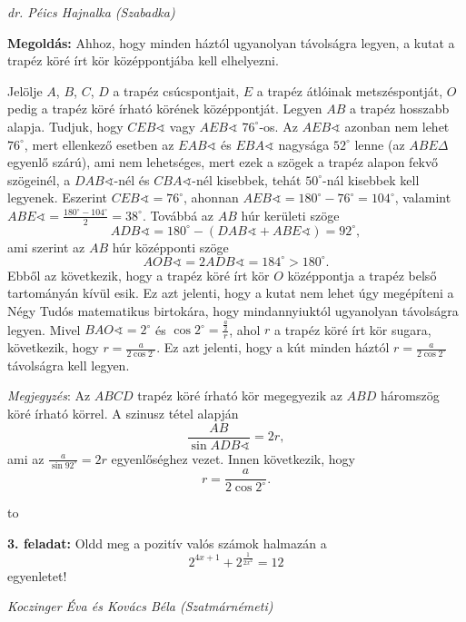 \documentclass[a4paper,10pt]{article}
\newcommand{\ki}[2]{\hfill {\it #1 (#2)}\medskip}
\newcommand{\vonal}{\hbox to \hsize{\hskip2truecm\hrulefill\hskip2truecm}}
\begin{document}
\ki{dr. Péics Hajnalka}{Szabadka}\medskip

{\bf Megoldás: }   Ahhoz, hogy minden háztól ugyanolyan távolságra le\-gyen,
a kutat a trapéz köré írt kör középpontjába kell elhelyezni.

Jelölje $A$, $B$, $C$, $D$ a trapéz csúcspontjait, $E$ a trapéz
átlóinak metszéspontját, $O$ pedig a trapéz köré írható körének
kö\-zép\-pont\-ját. Legyen $AB$ a trapéz hosszabb alapja. Tudjuk,
hogy ${CEB}\sphericalangle$ vagy ${AEB}\sphericalangle$ $76^\circ$-os. Az
${AEB}\sphericalangle$ azonban nem lehet $76^\circ $, mert ellenkező
esetben az ${EAB}\sphericalangle$ és ${EBA}\sphericalangle$ nagysága $52^\circ $
lenne (az $ABE\Delta $ egyenlő szárú), ami nem lehetséges, mert
ezek a szögek a trapéz alapon fekvő szögeinél, a
${DAB}\sphericalangle$-nél és ${CBA}\sphericalangle$-nél kisebbek, tehát $50^\circ
$-nál kisebbek kell legyenek. Eszerint ${CEB}\sphericalangle = 76^\circ $,
ahonnan ${AEB}\sphericalangle= 180^\circ - 76^\circ  = 104^\circ $,
valamint ${ABE}\sphericalangle = \frac{{180^\circ - 104^\circ }}{2} =
38^\circ $. Továbbá az $AB$ húr kerületi szöge $${ADB}\sphericalangle =
180^\circ  - ({DAB}\sphericalangle + {ABE}\sphericalangle) = 92^\circ ,$$ ami
szerint az $AB$ húr középponti szöge $${AOB}\sphericalangle =
2{ADB}\sphericalangle = 184^\circ
> 180^\circ .$$ Ebből az következik, hogy a trapéz köré írt
kör $O$ középpontja a trapéz belső tartományán kívül esik. Ez azt
jelenti, hogy a kutat nem lehet úgy megépíteni a Négy Tudós
mate\-ma\-ti\-kus birtokára, hogy mindannyiuktól ugyanolyan
távolságra legyen. Mivel ${BAO}\sphericalangle  = 2^\circ $ és $\cos
2^\circ  = \frac{{\frac{a}{2}}}{r}$, ahol $r$ a trapéz köré
írt kör sugara, következik, hogy $r = \frac{a}{{2\cos 2^\circ
}}$. Ez azt jelenti, hogy a kút minden háztól $r = \frac{a}{{2\cos
2^\circ }}$ távolságra kell legyen.

\medskip

\textit{Megjegyzés}: Az  $ABCD$  trapéz köré írható kör megegyezik az  $ABD$
háromszög köré írható körrel. A szinusz tétel alapján
\[\frac{{AB}}{{\sin {ADB}\sphericalangle}} = 2r,\] ami az
 $\frac{a}{{\sin {{92}^ \circ }}} = 2r$ egyenlőséghez vezet. Innen következik, hogy
 \[r = \frac{a}{{2\cos {2^ \circ }}}.\]

\medskip 

\vonal

{\bf 3. feladat: } Oldd meg a pozitív valós számok halmazán a $$
\displaystyle 2^{4x+1}+2^{\frac{1}{2x^{2}}}=12 $$
 egyenletet!

\ki{Koczinger Éva és Kovács Béla}{Szatmárnémeti}\medskip
\end{document}
